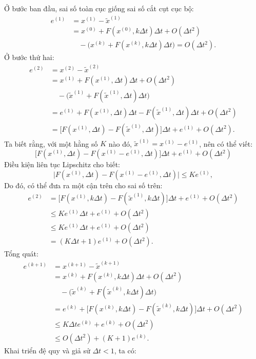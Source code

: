 Ở bước ban đầu, sai số toàn cục giống sai số cắt cụt cục bộ:
\[\begin{aligned}
e^{(1)}&=x^{(1)}-\tilde x^{(1)}\\
&=x^{(0)}+F(x^{(0)},k\Delta t)\Delta t+O(\Delta t^2)\\
&\quad-\bigl(x^{(k)}+F(x^{(k)},k\Delta t)\Delta t\bigr)=O(\Delta t^2).
\end{aligned}\]
Ở bước thứ hai:
\[\begin{aligned}
e^{(2)}&=x^{(2)}-\tilde x^{(2)}\\
&=x^{(1)}+F(x^{(1)},\Delta t)\Delta t+O(\Delta t^2)\\
&\quad-\bigl(\tilde x^{(1)}+F(\tilde x^{(1)},\Delta t)\Delta t\bigr)\\
&=e^{(1)}+F(x^{(1)},\Delta t)\Delta t-F(\tilde x^{(1)},\Delta t)\Delta t+O(\Delta t^2)\\
&=\bigl[F(x^{(1)},\Delta t)-F(\tilde x^{(1)},\Delta t)\bigr]\Delta t+e^{(1)}+O(\Delta t^2).
\end{aligned}\]
Ta biết rằng, với một hằng số $K$ nào đó, $\tilde x^{(1)}=x^{(1)}-e^{(1)}$, nên có thể viết:
\[\bigl[F(x^{(1)},\Delta t)-F(x^{(1)}-e^{(1)},\Delta t)\bigr]\Delta t+e^{(1)}+O(\Delta t^2)\]
Điều kiện liên tục Lipschitz cho biết:
\[\bigl\lvert F(x^{(1)},\Delta t)-F(x^{(1)}-e^{(1)},\Delta t)\bigr\rvert\le Ke^{(1)},\]
Do đó, có thể đưa ra một cận trên cho sai số trên:
\[\begin{aligned}
e^{(2)}&=\bigl[F(x^{(1)},k\Delta t)-F(\tilde x^{(1)},k\Delta t)\bigr]\Delta t+e^{(1)}+O(\Delta t^2)\\
&\le Ke^{(1)}\Delta t+e^{(1)}+O(\Delta t^2)\\
&\le Ke^{(1)}\Delta t+e^{(1)}+O(\Delta t^2)\\
&=(K\Delta t+1)e^{(1)}+O(\Delta t^2).
\end{aligned}\]
Tổng quát:
\[\begin{aligned}
e^{(k+1)}&=x^{(k+1)}-\tilde x^{(k+1)}\\
&=x^{(k)}+F(x^{(k)},k\Delta t)\Delta t+O(\Delta t^2)\\
&\quad-\bigl(\tilde x^{(k)}+F(\tilde x^{(k)},k\Delta t)\Delta t\bigr)\\
&=e^{(k)}+\bigl[F(x^{(k)},k\Delta t)-F(\tilde x^{(k)},k\Delta t)\bigr]\Delta t+O(\Delta t^2)\\
&\le K\Delta t e^{(k)}+e^{(k)}+O(\Delta t^2)\\
&\le O(\Delta t^2)+(K+1)e^{(k)}.
\end{aligned}\]
Khai triển đệ quy và giả sử $\Delta t<1$, ta có:
